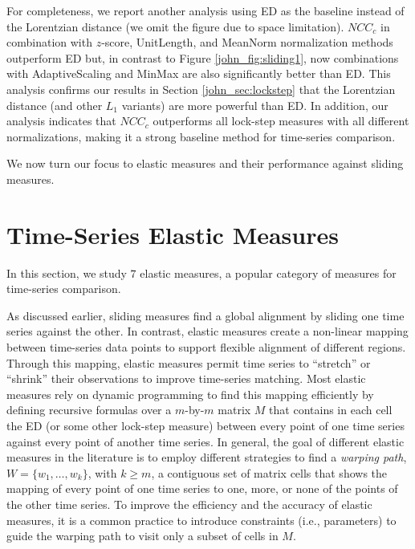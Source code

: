 \documentclass[11pt]{article}
\begin{document}
For completeness, we report another analysis using ED as the baseline instead of the Lorentzian distance (we omit the figure due to space limitation). $NCC_{c}$ in combination with $z$-score, UnitLength, and MeanNorm normalization methods outperform ED but, in contrast to Figure \ref{john_fig:sliding1}, now combinations with AdaptiveScaling and MinMax are also significantly better than ED. This analysis confirms our results in Section \ref{john_sec:lockstep} that the Lorentzian distance (and other $L_{1}$ variants) are more powerful than ED. In addition, our analysis indicates that $NCC_{c}$ outperforms all lock-step measures with all different normalizations, making it a strong baseline method for time-series comparison.

We now turn our focus to elastic measures and their performance against sliding measures.

\section{Time-Series Elastic Measures}
\label{john_sec:elastic}

In this section, we study $7$ elastic measures, a popular category of measures for time-series comparison.

As discussed earlier, sliding measures find a global alignment by sliding one time series against the other. In contrast, elastic measures create a non-linear mapping between time-series data points to support flexible alignment of different regions. Through this mapping, elastic measures permit time series to ``stretch'' or ``shrink'' their observations to improve time-series matching. Most elastic measures rely on dynamic programming to find this mapping efficiently by defining recursive formulas over a $m$-by-$m$ matrix $M$ that contains in each cell the ED (or some other lock-step measure) between every point of one time series against every point of another time series. In general, the goal of different elastic measures in the literature is to employ different strategies to find a {\em warping path}, $W=\{w_1,\ldots,w_k\}$, with $k\geq m$, a contiguous set of matrix cells that shows the mapping of every point of one time series to one, more, or none of the points of the other time series. To improve the efficiency and the accuracy of elastic measures, it is a common practice to introduce constraints (i.e., parameters) to guide the warping path to visit only a subset of cells in $M$.
\end{document}
